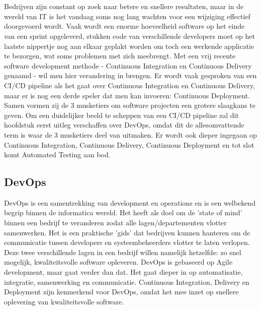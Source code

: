 \chapter{}
\label{ch:ci-cd-cd}
Bedrijven zijn constant op zoek naar betere en snellere resultaten, maar in de wereld van IT is het vandaag soms nog lang wachten voor een wijziging effectief doorgevoerd wordt. Vaak wordt een enorme hoeveelheid software op het einde van een sprint opgeleverd, stukken code van verschillende developers moet op het laatste nippertje nog aan elkaar geplakt worden om toch een werkende applicatie te bezorgen, wat soms problemen met zich meebrengt. Met een vrij recente software development methode - Continuous Integration en Continuous Delivery genaamd - wil men hier verandering in brengen. Er wordt vaak gesproken van een CI/CD pipeline als het gaat over Continuous Integration en Continuous Delivery, maar er is nog een derde speler dat men kan invoeren: Continuous Deployment. Samen vormen zij de 3 musketiers om software projecten een grotere slaagkans te geven.
Om een duidelijker beeld te scheppen van een CI/CD pipeline zal dit hoofdstuk eerst uitleg verschaffen over DevOps, omdat dit de allesomvattende term is waar de 3 musketiers deel van uitmaken. Er wordt ook dieper ingegaan op Continuous Integration, Continuous Delivery, Continuous Deployment en tot slot komt Automated Testing aan bod.
        \section{DevOps}
        DevOps is een samentrekking van development en operations en is een welbekend begrip binnen de informatica wereld. Het heeft als doel om de 'state of mind' binnen een bedrijf te veranderen zodat alle lagen/departementen vlotter samenwerken. Het is een praktische 'gids' dat bedrijven kunnen hanteren om de communicatie tussen developers en systeembeheerders vlotter te laten verlopen. Deze twee verschillende lagen in een bedrijf willen namelijk hetzelfde: zo snel mogelijk, kwaliteitsvolle software opleveren. DevOps is gebaseerd op Agile development, maar gaat verder dan dat. Het gaat dieper in op automatisatie, integratie, samenwerking en communicatie. 
        Continuous Integration, Delivery en Deployment zijn kenmerkend voor DevOps, omdat het mee inzet op snellere oplevering van kwaliteitsvolle software. ~\autocite{Riti2018}
    
